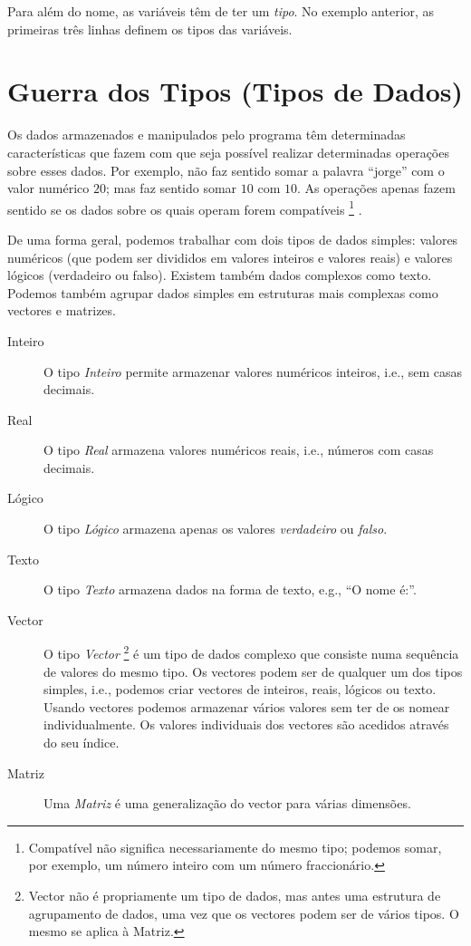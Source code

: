 Para além do nome, as variáveis têm de ter um \emph{tipo}. No exemplo anterior, as primeiras três linhas definem os tipos das variáveis. 

\section{Guerra dos Tipos (Tipos de Dados)}
Os dados armazenados e manipulados pelo programa têm determinadas características que fazem
com que seja possível realizar determinadas operações sobre esses dados. Por exemplo, não
faz sentido somar a palavra ``jorge'' com o valor numérico $20$; mas faz sentido somar $10$ com $10$. As
operações apenas fazem sentido se os dados sobre os quais operam forem compatíveis%
\footnote{Compatível não significa necessariamente do mesmo tipo; podemos somar, por exemplo, um número inteiro com um número fraccionário. }%
.

De uma forma geral, podemos trabalhar com dois tipos de dados simples: valores numéricos (que podem ser divididos em 
valores inteiros e valores reais) e valores lógicos (verdadeiro ou falso). Existem também dados complexos como texto. Podemos também agrupar
dados simples em estruturas mais complexas como vectores e matrizes.

\begin{description}
\item[Inteiro]
O tipo \emph{Inteiro} permite armazenar valores numéricos inteiros, i.e., sem casas decimais. 

\item[Real]
O tipo \emph{Real} armazena valores numéricos reais, i.e., números com casas decimais.

\item[Lógico]
O tipo \emph{Lógico} armazena apenas os valores \emph{verdadeiro} ou \emph{falso}.

\item[Texto]
O tipo \emph{Texto} armazena dados na forma de texto, e.g., ``O nome é:''.

\item[Vector]
O tipo \emph{Vector}%
\footnote{Vector não é propriamente um tipo de dados, mas antes uma estrutura de agrupamento de dados, uma vez que os vectores podem ser de vários tipos. O mesmo se aplica à Matriz.}
 é um tipo de dados complexo que consiste numa sequência de valores do mesmo tipo. Os
vectores podem ser de qualquer um dos tipos simples, i.e., podemos criar vectores de inteiros, reais, lógicos ou texto.
Usando vectores podemos armazenar vários valores sem ter de os nomear individualmente. Os valores individuais dos vectores
são acedidos através do seu índice.

\item[Matriz]
Uma \emph{Matriz} é uma generalização do vector para várias dimensões.
\end{description}

